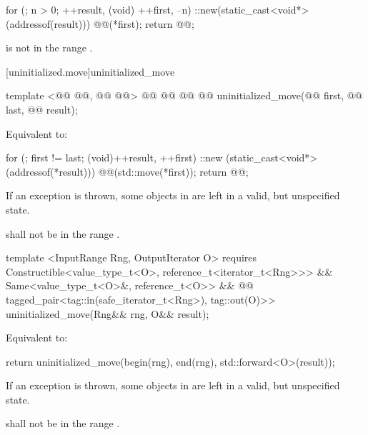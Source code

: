 \pnum
\effects {}
\begin{codeblock}
        for (; n > 0; ++result, (void) ++first, --n)
          ::new(static_cast<void*>(addressof(result)))
            @@(*first);
        return @@;
\end{codeblock}

{\color{addclr}
\pnum
\requires {} is not in the range \tcode{[first, next(first, n))}.
} %

[uninitialized.move]{uninitialized_move}
\begin{codeblock}
  template <@@ @@,
            @@ @@>
    @@
             @@
             @@
  @@
    uninitialized_move(@@ first, @@ last, @@ result);
\end{codeblock}

\setcounter{Paras}{0}
\pnum
\effects Equivalent to:
\begin{codeblock}
        for (; first != last; (void)++result, ++first)
          ::new (static_cast<void*>(addressof(*result)))
            @@(std::move(*first));
        return @@;
\end{codeblock}

\pnum
\remarks If an exception is thrown, some objects in \tcode{[first, last)} are left in a valid, but unspecified state.

{\color{addclr}
\pnum
\requires {} shall not be in the range \tcode{[first, last)}.

\begin{codeblock}
  template <InputRange Rng, OutputIterator O>
    requires Constructible<value_type_t<O>, reference_t<iterator_t<Rng>>> &&
             Same<value_type_t<O>&, reference_t<O>> &&
             @@
  tagged_pair<tag::in(safe_iterator_t<Rng>), tag::out(O)>>
    uninitialized_move(Rng&& rng, O&& result);
\end{codeblock}

\pnum
\effects Equivalent to:
\begin{codeblock}
        return uninitialized_move(begin(rng), end(rng), std::forward<O>(result));
\end{codeblock}

\pnum
\remarks If an exception is thrown, some objects in \tcode{[first, last)} are left in a valid, but unspecified state.

\pnum
\requires {} shall not be in the range \tcode{[first, last)}.
} %

